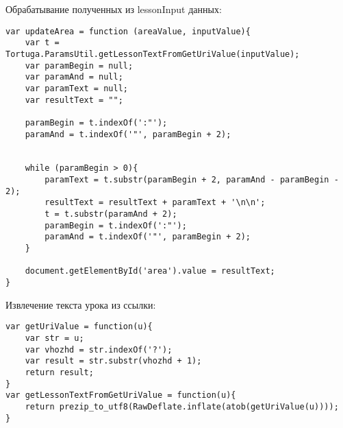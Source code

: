Обрабатывание полученных из lessonInput  данных:
\begin{verbatim}
var updateArea = function (areaValue, inputValue){
    var t =  Tortuga.ParamsUtil.getLessonTextFromGetUriValue(inputValue);
    var paramBegin = null;
    var paramAnd = null;
    var paramText = null;
    var resultText = "";

    paramBegin = t.indexOf(':"');
    paramAnd = t.indexOf('"', paramBegin + 2);

	
    while (paramBegin > 0){
        paramText = t.substr(paramBegin + 2, paramAnd - paramBegin - 2);
        resultText = resultText + paramText + '\n\n';
        t = t.substr(paramAnd + 2);
        paramBegin = t.indexOf(':"');
        paramAnd = t.indexOf('"', paramBegin + 2);
    }

    document.getElementById('area').value = resultText;
}
\end{verbatim}

Извлечение текста урока из ссылки:
\begin{verbatim}
var getUriValue = function(u){
    var str = u;
    var vhozhd = str.indexOf('?');
    var result = str.substr(vhozhd + 1);
    return result;
}
var getLessonTextFromGetUriValue = function(u){
    return prezip_to_utf8(RawDeflate.inflate(atob(getUriValue(u))));
} 
\end{verbatim}

